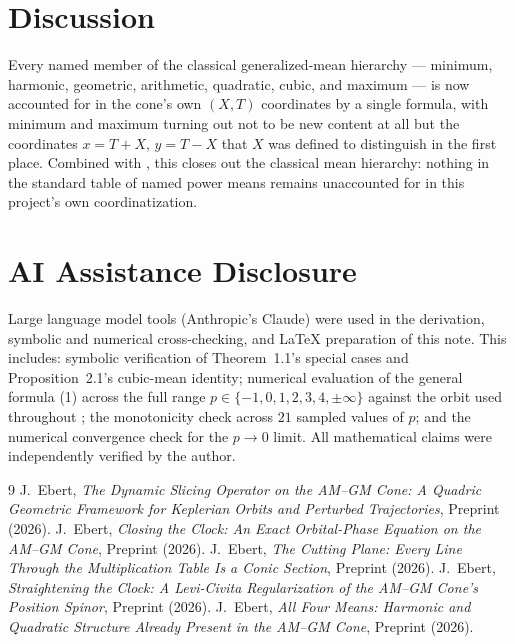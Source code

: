 \documentclass[12pt]{amsart}
\theoremstyle{plain}
\theoremstyle{remark}
\begin{document}
\section{Discussion}

Every named member of the classical generalized-mean hierarchy --- minimum, harmonic, geometric, arithmetic, quadratic, cubic, and maximum --- is now accounted for in the cone's own $(X,T)$ coordinates by a single formula, with minimum and maximum turning out not to be new content at all but the coordinates $x=T+X$, $y=T-X$ that $X$ was defined to distinguish in the first place. Combined with \cite{Ebert2026FourMeans}, this closes out the classical mean hierarchy: nothing in the standard table of named power means remains unaccounted for in this project's own coordinatization.

\section*{AI Assistance Disclosure}

Large language model tools (Anthropic's Claude) were used in the derivation, symbolic and numerical cross-checking, and \LaTeX{} preparation of this note. This includes: symbolic verification of Theorem~1.1's special cases and Proposition~2.1's cubic-mean identity; numerical evaluation of the general formula (1) across the full range $p\in\{-1,0,1,2,3,4,\pm\infty\}$ against the orbit used throughout \cite{Ebert2026Clock,Ebert2026LeviCivita,Ebert2026FourMeans}; the monotonicity check across $21$ sampled values of $p$; and the numerical convergence check for the $p\to0$ limit. All mathematical claims were independently verified by the author.

\begin{thebibliography}{9}
 J.~Ebert, \emph{The Dynamic Slicing Operator on the AM--GM Cone: A Quadric Geometric Framework for Keplerian Orbits and Perturbed Trajectories}, Preprint (2026).
 J.~Ebert, \emph{Closing the Clock: An Exact Orbital-Phase Equation on the AM--GM Cone}, Preprint (2026).
 J.~Ebert, \emph{The Cutting Plane: Every Line Through the Multiplication Table Is a Conic Section}, Preprint (2026).
 J.~Ebert, \emph{Straightening the Clock: A Levi-Civita Regularization of the AM--GM Cone's Position Spinor}, Preprint (2026).
 J.~Ebert, \emph{All Four Means: Harmonic and Quadratic Structure Already Present in the AM--GM Cone}, Preprint (2026).
\end{thebibliography}
\end{document}
